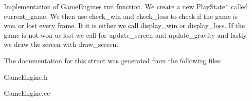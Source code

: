 Implementation of Game\+Engines run function. We create a new Play\+State$\ast$ called current\+\_\+game. We then use check\+\_\+win and check\+\_\+loss to check if the game is won or lost every frame. If it is either we call display\+\_\+win or display\+\_\+loss. If the game is not won or lost we call for update\+\_\+screen and update\+\_\+gravity and lastly we draw the screen with draw\+\_\+screen. 

The documentation for this struct was generated from the following files\+:\begin{DoxyCompactItemize}
\item 
Game\+Engine.\+h\item 
Game\+Engine.\+cc\end{DoxyCompactItemize}
